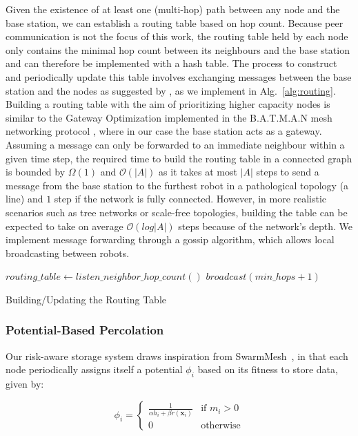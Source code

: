 \documentclass[sigconf]{aamas}
\begin{document}
Given the existence of at least one (multi-hop) path between any node and the base station, 
we can establish a routing table based on hop count. Because peer communication is not the 
focus of this work, the routing table held by each node only contains the minimal hop count 
between its neighbours and the base station and can therefore
be implemented with a hash table. The process to construct and periodically update this 
table involves exchanging messages between the base station and the nodes as suggested by 
\cite{abdullah2015detecting}, as we implement in Alg.~\ref{alg:routing}. Building a routing 
table with the aim of prioritizing higher capacity nodes is similar to the Gateway 
Optimization \cite{openMesh2021gateways} implemented in the B.A.T.M.A.N mesh networking 
protocol \cite{johnson2008simple}, where in our case the base station acts as a gateway.
Assuming a message can only be forwarded to an immediate neighbour within a given time 
step, the required time to build the routing table in a connected graph is bounded by 
$\Omega(1)$ and $\mathcal{O}(|A|)$ as it takes at most $|A|$ steps to send a message from 
the base station to the furthest robot in a pathological topology (a line) and $1$ step if 
the network is fully connected. However, in more realistic scenarios such as tree networks 
or scale-free topologies, building the table can be expected to take on average 
$\mathcal{O}(log|A|)$ steps because of the network's depth. We implement message forwarding through a gossip algorithm, which allows local broadcasting between robots.

\begin{algorithm}[h]
\small
\SetAlgoLined
\DontPrintSemicolon
    $routing\_table \longleftarrow listen\_neighbor\_hop\_count()$\;
    \;
    \;
    $broadcast(min\_hops + 1)$\;
\caption{Building/Updating the Routing Table}
\label{alg:routing}
\end{algorithm}

\subsubsection{Potential-Based Percolation}
Our risk-aware storage system draws inspiration from 
SwarmMesh~\cite{majcherczykSwarmmesh2020}, in that each node periodically assigns
itself a potential $\phi_i$ based on its fitness to store data, given by:

\begin{equation}
        \phi_i =
        \left\{ 
        \begin{array}{ll}
            \frac{1}{\alpha h_i + \beta r({\bm{x}_i})} &\text{if } m_i > 0 \\
            0 &\text{otherwise}
        \end{array} \right.
        \label{equation:fitness}
\end{equation}
\end{document}
